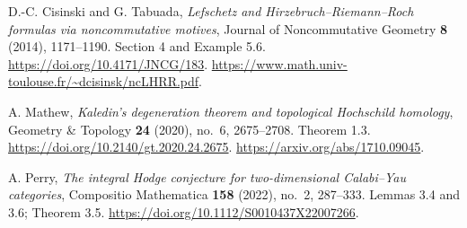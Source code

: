 D.-C. Cisinski and G. Tabuada,
\emph{Lefschetz and Hirzebruch--Riemann--Roch formulas via noncommutative motives},
Journal of Noncommutative Geometry \textbf{8} (2014), 1171--1190.
Section 4 and Example 5.6.
\url{https://doi.org/10.4171/JNCG/183}.
\url{https://www.math.univ-toulouse.fr/~dcisinsk/ncLHRR.pdf}.

A. Mathew,
\emph{Kaledin's degeneration theorem and topological Hochschild homology},
Geometry \& Topology \textbf{24} (2020), no.~6, 2675--2708.
Theorem 1.3.
\url{https://doi.org/10.2140/gt.2020.24.2675}.
\url{https://arxiv.org/abs/1710.09045}.

A. Perry,
\emph{The integral Hodge conjecture for two-dimensional Calabi--Yau categories},
Compositio Mathematica \textbf{158} (2022), no.~2, 287--333.
Lemmas 3.4 and 3.6; Theorem 3.5.
\url{https://doi.org/10.1112/S0010437X22007266}.
